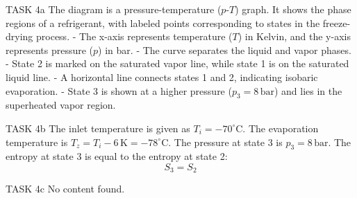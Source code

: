 TASK 4a  
The diagram is a pressure-temperature (\(p\)-\(T\)) graph. It shows the phase regions of a refrigerant, with labeled points corresponding to states in the freeze-drying process.  
- The x-axis represents temperature (\(T\)) in Kelvin, and the y-axis represents pressure (\(p\)) in bar.  
- The curve separates the liquid and vapor phases.  
- State 2 is marked on the saturated vapor line, while state 1 is on the saturated liquid line.  
- A horizontal line connects states 1 and 2, indicating isobaric evaporation.  
- State 3 is shown at a higher pressure (\(p_3 = 8 \, \text{bar}\)) and lies in the superheated vapor region.  

TASK 4b  
The inlet temperature is given as \( T_i = -70^\circ\text{C} \).  
The evaporation temperature is \( T_z = T_i - 6 \, \text{K} = -78^\circ\text{C} \).  
The pressure at state 3 is \( p_3 = 8 \, \text{bar} \).  
The entropy at state 3 is equal to the entropy at state 2:  
\[
S_3 = S_2
\]  

TASK 4c  
No content found.